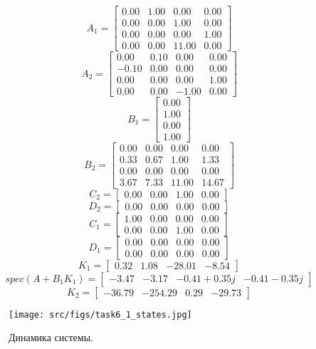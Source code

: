 \[A_1 = \begin{bmatrix}
        0.00 &  1.00 &  0.00 &  0.00\\
        0.00 &  0.00 &  1.00 &  0.00\\
        0.00 &  0.00 &  0.00 &  1.00\\
        0.00 &  0.00 &  11.00 &  0.00
      \end{bmatrix}\]
      \[A_2 = \begin{bmatrix}
        0.00 &  0.10 &  0.00 &  0.00\\
       -0.10 &  0.00 &  0.00 &  0.00\\
        0.00 &  0.00 &  0.00 &  1.00\\
        0.00 &  0.00 & -1.00 &  0.00
      \end{bmatrix}\]
      \[B_1 = \begin{bmatrix}
        0.00\\
        1.00\\
        0.00\\
        1.00
      \end{bmatrix}\]
      \[B_2 = \begin{bmatrix}
        0.00 &  0.00 &  0.00 &  0.00\\
        0.33 &  0.67 &  1.00 &  1.33\\
        0.00 &  0.00 &  0.00 &  0.00\\
        3.67 &  7.33 &  11.00 &  14.67
      \end{bmatrix}\]
      \[C_2 = \begin{bmatrix}
        0.00 &  0.00 &  1.00 &  0.00
      \end{bmatrix}\]
      \[D_2 = \begin{bmatrix}
        0.00 &  0.00 &  0.00 &  0.00
      \end{bmatrix}\]
      \[C_1 = \begin{bmatrix}
        1.00 &  0.00 &  0.00 &  0.00\\
        0.00 &  0.00 &  1.00 &  0.00
      \end{bmatrix}\]
      \[D_1 = \begin{bmatrix}
        0.00 &  0.00 &  0.00 &  0.00\\
        0.00 &  0.00 &  0.00 &  0.00
      \end{bmatrix}\]
      \[K_1 = \begin{bmatrix}
        0.32 &  1.08 & -28.01 & -8.54
      \end{bmatrix}\]
      \[spec(A + B_1 K_1) = \begin{bmatrix}
       -3.47 & -3.17 & -0.41 + 0.35j & -0.41 -0.35j
      \end{bmatrix}\]
      \[K_2 = \begin{bmatrix}
       -36.79 & -254.29 &  0.29 & -29.73
      \end{bmatrix}\]
\begin{figure}[ht!]
        \centering
        \texttt{[image: src/figs/task6\_1\_states.jpg]}
        \caption{Динамика системы.}
        \label{fig:task6_1_states}
\end{figure}

